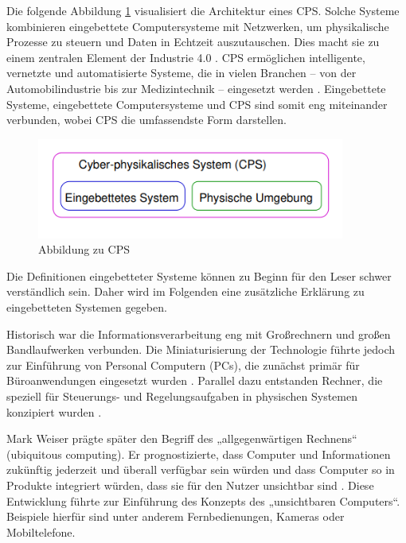 Die folgende Abbildung \ref{fig:cbs-systeme} visualisiert die Architektur eines CPS. Solche Systeme kombinieren eingebettete Computersysteme mit Netzwerken, um physikalische Prozesse zu steuern und Daten in Echtzeit auszutauschen. Dies macht sie zu einem zentralen Element der Industrie 4.0 \cite{Westermann.2016}.  
CPS ermöglichen intelligente, vernetzte und automatisierte Systeme, die in vielen Branchen – von der Automobilindustrie bis zur Medizintechnik – eingesetzt werden \cite{Westermann.2016}. Eingebettete Systeme, eingebettete Computersysteme und CPS sind somit eng miteinander verbunden, wobei CPS die umfassendste Form darstellen.  

\begin{figure}[h]
	\centering
	\includegraphics[width=0.9\textwidth]{img/CPS.png}
	\caption{Abbildung zu CPS \cite{Marwedel.2021}}
	\label{fig:cbs-systeme}
\end{figure}
Die Definitionen eingebetteter Systeme können zu Beginn für den Leser schwer verständlich sein. Daher wird im Folgenden eine zusätzliche Erklärung zu eingebetteten Systemen gegeben.  

Historisch war die Informationsverarbeitung eng mit Großrechnern und großen Bandlaufwerken verbunden. Die Miniaturisierung der Technologie führte jedoch zur Einführung von Personal Computern (PCs), die zunächst primär für Büroanwendungen eingesetzt wurden \cite{Ubiquitous_Computing_1994}. Parallel dazu entstanden Rechner, die speziell für Steuerungs- und Regelungsaufgaben in physischen Systemen konzipiert wurden \cite{Ubiquitous_Computing_1994}.  

Mark Weiser prägte später den Begriff des „allgegenwärtigen Rechnens“ (ubiquitous computing). Er prognostizierte, dass Computer und Informationen zukünftig jederzeit und überall verfügbar sein würden und dass Computer so in Produkte integriert würden, dass sie für den Nutzer unsichtbar sind \cite{Ubiquitous_Computing_1994}. Diese Entwicklung führte zur Einführung des Konzepts des „unsichtbaren Computers“. Beispiele hierfür sind unter anderem Fernbedienungen, Kameras oder Mobiltelefone.  


